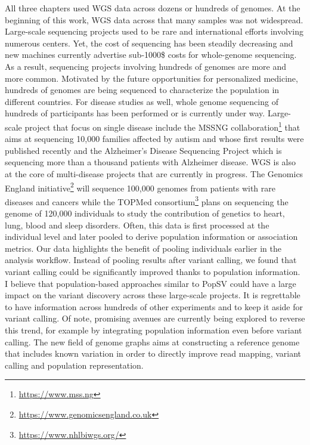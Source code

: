 All three chapters used WGS data across dozens or hundreds of genomes.
At the beginning of this work, WGS data across that many samples was not widespread.
Large-scale sequencing projects used to be rare and international efforts involving numerous centers\cite{Lander2001,Durbin2010}.
Yet, the cost of sequencing has been steadily decreasing and new machines currently advertise sub-1000\$ costs for whole-genome sequencing.
As a result, sequencing projects involving hundreds of genomes are more and more common.
Motivated by the future opportunities for personalized medicine, hundreds of genomes are being sequenced to characterize the population in different countries\cite{Francioli2014,Wong2013,Gudbjartsson2015}.
For disease studies as well, whole genome sequencing of hundreds of participants has been performed or is currently under way.
Large-scale project that focus on single disease include the MSSNG collaboration\footnote{\url{https://www.mss.ng}} that aims at sequencing 10,000 families affected by autism and whose first results were published recently\cite{Yuen2017} and the Alzheimer's Disease Sequencing Project\cite{Beecham2017} which is sequencing more than a thousand patients with Alzheimer disease.
WGS is also at the core of multi-disease projects that are currently in progress.
The Genomics England initiative\footnote{\url{https://www.genomicsengland.co.uk}} will sequence 100,000 genomes from patients with rare diseases and cancers while the TOPMed consortium\footnote{\url{https://www.nhlbiwgs.org/}} plans on sequencing the genome of 120,000 individuals to study the contribution of genetics to heart, lung, blood and sleep disorders.
Often, this data is first processed at the individual level and later pooled to derive population information or association metrics.
Our data highlights the benefit of pooling individuals earlier in the analysis workflow.
Instead of pooling results after variant calling, we found that variant calling could be significantly improved thanks to population information.
I believe that population-based approaches similar to {\sf PopSV} could have a large impact on the variant discovery across these large-scale projects.
It is regrettable to have information across hundreds of other experiments and to keep it aside for variant calling. 
Of note, promising avenues are currently being explored to reverse this trend, for example by integrating population information even before variant calling.
The new field of genome graphs aims at constructing a reference genome that includes known variation in order to directly improve read mapping, variant calling and population representation.


